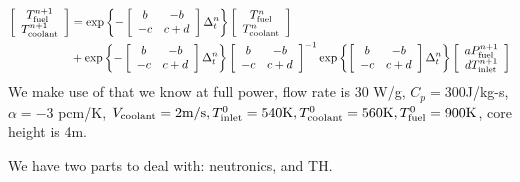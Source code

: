 \documentclass{school-22.211-notes}
\begin{document}
\begin{align}
 \left[ \begin{array}{c} T_{\mathrm{fuel}}^{n+1} \\ T_{\mathrm{coolant}}^{n+1} \end{array} \right]
&= \exp \left\{ -  \left[ \begin{array}{cc} b & -b \\ -c & c+d \end{array} \right] \Delta_t^n \right\}
\left[ \begin{array}{c} T_{\mathrm{fuel}}^n \\ T_{\mathrm{coolant}}^n \end{array} \right] \notag \\
&+ \exp \left\{ -  \left[ \begin{array}{cc} b & -b \\ -c & c+d \end{array} \right] \Delta_t^n \right\}
\left[ \begin{array}{cc} b & -b \\ -c & c+d \end{array} \right]^{-1}
\exp \left\{ \left[ \begin{array}{cc} b & -b \\ -c & c+d \end{array} \right] \Delta_t^n \right\}
\left[ \begin{array}{c} a P_{\mathrm{fuel}}^{n+1} \\ d T_{\mathrm{inlet}}^{n+1} \end{array} \right] \label{TH-analytical}
\end{align}
We make use of that we know at full power,  flow rate is 30 W/g, $C_p = 300$J/kg-s, $\alpha = -3$ pcm/K, $V_{\mathrm{coolant}} = 2 \mathrm{m}/\mathrm{s}, T_{\mathrm{inlet}}^0 = 540 \mathrm{K}, T_{\mathrm{coolant}}^0 = 560 \mathrm{K}, T_{\mathrm{fuel}}^0 = 900 \mathrm{K}$, core height is 4m. 


\clearpage
{}
We have two parts to deal with: neutronics, and TH. 
\end{document}
